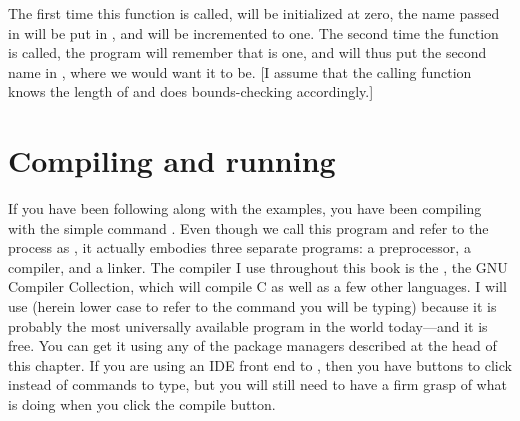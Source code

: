 The first time this function is called, 
will be initialized at zero, the name passed in will be put in
, and  will be
incremented to one. The second time the function is called, the program
will remember that  is one, and will thus put the
second name in , where we would want it to be.
[I assume that the calling function knows the length of
 and does bounds-checking accordingly.]


\section{Compiling and running}\label{compilation}  

If you have been following along with the examples, you have been
compiling with the simple command . 
Even though we call this program  and refer to the
process as , it actually
embodies three separate programs: a
preprocessor, a compiler, and a linker. The compiler I use
throughout this book is the , the GNU Compiler Collection, which will
compile C as well as a few other languages. I will use  (herein
lower case to refer to the command you will be typing) because it is probably
the most universally available program in the world today---and it is free.
You can get it using any of the package managers described at the head
of this chapter. If you are using an IDE front end to ,
then you have buttons to click instead of commands to type, but you will
still need to have a firm grasp of what  is doing when you
click the compile button.

